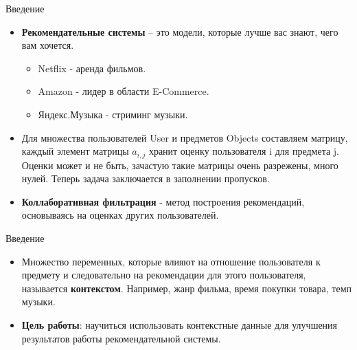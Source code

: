 \documentclass{beamer}
\begin{document}
\begin{frame}{Введение}
  \begin{itemize}
  
  \item {
    \textbf{Рекомендательные системы} – это модели, которые лучше вас знают, чего вам хочется.
    \pause
    
    \begin{itemize}
    
    \item {
        Netflix - аренда фильмов.
    }
    
    \pause
    
    \item {
        Amazon - лидер в области E-Commerce.
    }
    
    \pause
    
    \item {
        Яндекс.Музыка - стриминг музыки.
    }
    
    \pause
    
    \end{itemize}
    
  }
  
  \item {   
    Для множества пользователей User и предметов Objects составляем матрицу, каждый элемент матрицы $a_{i,j}$ хранит оценку пользователя i для предмета j. Оценки может и не быть, зачастую такие матрицы очень разрежены, много нулей. Теперь задача заключается в заполнении пропусков.
    \pause
  }
 
  \item {
    \textbf{Коллаборативная фильтрация} - метод построения рекомендаций, основываясь на оценках других пользователей.
  }
  
  \end{itemize}
\end{frame}


\begin{frame}{Введение}

    \begin{itemize}
    
    \item {
        Множество переменных, которые влияют на отношение пользователя к предмету и следовательно на рекомендации для этого пользователя, называется \textbf{контекстом}. Например, жанр фильма, время покупки товара, темп музыки.
    
    }
    
    \item {
        \textbf{Цель работы}: научиться использовать контекстные данные для улучшения результатов работы рекомендательной системы.
    }
    
    \end{itemize}

\end{frame}
\end{document}
